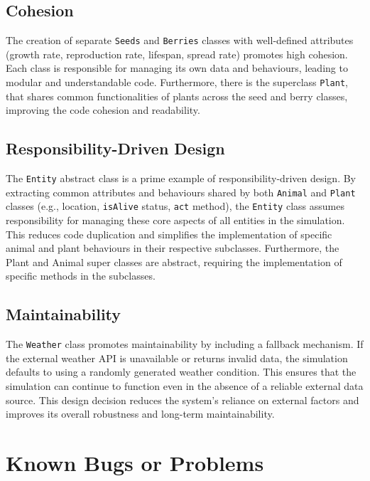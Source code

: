 \documentclass{article}
\begin{document}
\subsection{Cohesion}

The creation of separate \texttt{Seeds} and \texttt{Berries} classes with well-defined attributes (growth rate, reproduction rate, lifespan, spread rate) promotes high cohesion. Each class is responsible for managing its own data and behaviours, leading to modular and understandable code. Furthermore, there is the superclass \texttt{Plant}, that shares common functionalities of plants across the seed and berry classes, improving the code cohesion and readability.

\subsection{Responsibility-Driven Design}

The \texttt{Entity} abstract class is a prime example of responsibility-driven design. By extracting common attributes and behaviours shared by both \texttt{Animal} and \texttt{Plant} classes (e.g., location, \texttt{isAlive} status, \texttt{act} method), the \texttt{Entity} class assumes responsibility for managing these core aspects of all entities in the simulation. This reduces code duplication and simplifies the implementation of specific animal and plant behaviours in their respective subclasses. Furthermore, the Plant and Animal super classes are abstract, requiring the implementation of specific methods in the subclasses.

\subsection{Maintainability}

The \texttt{Weather} class promotes maintainability by including a fallback mechanism. If the external weather API is unavailable or returns invalid data, the simulation defaults to using a randomly generated weather condition. This ensures that the simulation can continue to function even in the absence of a reliable external data source. This design decision reduces the system's reliance on external factors and improves its overall robustness and long-term maintainability.

\section{Known Bugs or Problems}
\end{document}
